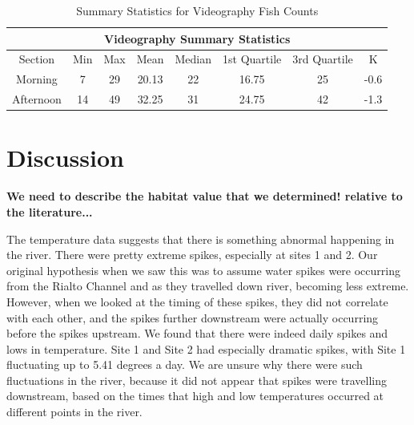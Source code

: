 \documentclass{article}
\begin{document}
\begin{table}
\caption{Summary Statistics for Videography Fish Counts}
\begin{tabular}{cccccccc}
 \hline
 \multicolumn{8}{c}{Videography Summary Statistics} \\
 \hline
 Section & Min & Max & Mean & Median & 1st Quartile & 3rd Quartile & K\\
 \hline
 Morning & 7 & 29 & 20.13 & 22  & 16.75 & 25 & -0.6\\
 Afternoon & 14 & 49 & 32.25 & 31 & 24.75 &  42 & -1.3\\
 \hline
\end{tabular}
\label{tab:fishcounts}
\end{table}

\section{Discussion}

\textbf{We need to describe the habitat value that we determined! relative to the literature...}

The temperature data suggests that there is something abnormal happening in the river. There were pretty extreme spikes, especially at sites 1 and 2. Our original hypothesis when we saw this was to assume water spikes were occurring from the Rialto Channel and as they travelled down river, becoming less extreme. However, when we looked at the timing of these spikes, they did not correlate with each other, and the spikes further downstream were actually occurring before the spikes upstream. We found that there were indeed daily spikes and lows in temperature. Site 1 and Site 2 had especially dramatic spikes, with Site 1 fluctuating up to 5.41 degrees a day. We are unsure why there were such fluctuations in the river, because it did not appear that spikes were travelling downstream, based on the times that high and low temperatures occurred at different points in the river. 
\end{document}
